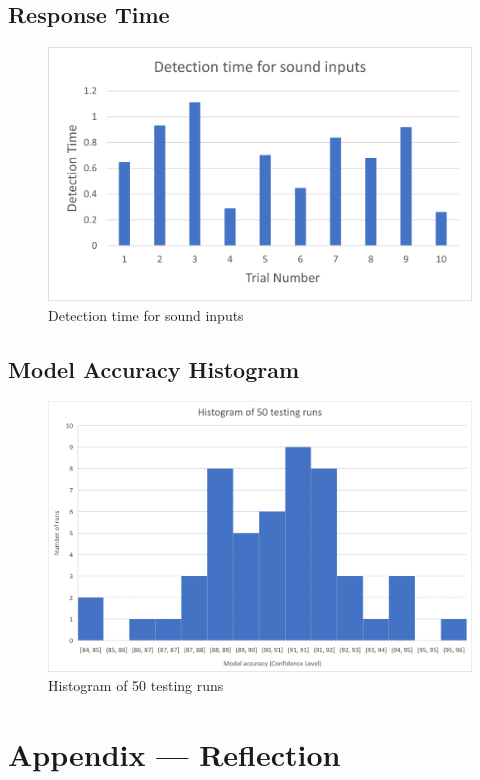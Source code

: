 \documentclass[12pt, titlepage]{article}
\begin{document}
\subsection*{Response Time}
\begin{figure}[H]
  \includegraphics[width=\textwidth,height=\textheight,keepaspectratio]{Responce_time.png}
  \caption{Detection time for sound inputs}
  \label{Response} 
\end{figure}
\subsection*{Model Accuracy Histogram}
\begin{figure}[H]
  \includegraphics[width=\textwidth,height=\textheight,keepaspectratio]{confidence_level.png}
  \caption{Histogram of 50 testing runs}
  \label{Histogram} 
\end{figure}


\section*{Appendix --- Reflection}
\end{document}
